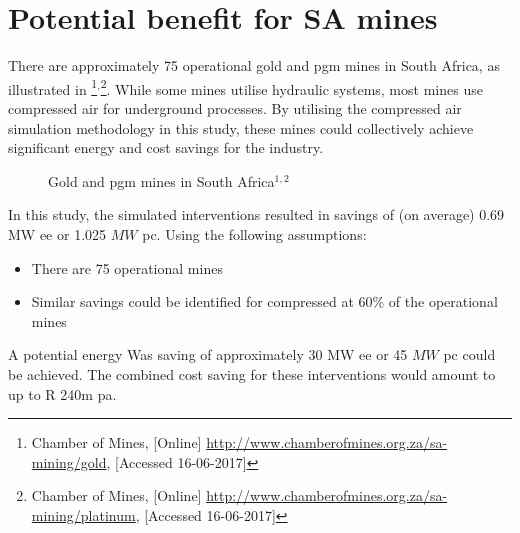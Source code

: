 \section{Potential benefit for SA mines}
There are approximately 75 operational gold and \gls{pgm} mines in South Africa, as illustrated in  \footnote{Chamber of Mines, [Online] \url{http://www.chamberofmines.org.za/sa-mining/gold}, [Accessed 16-06-2017]}$^,$\footnote{Chamber of Mines, [Online] \url{http://www.chamberofmines.org.za/sa-mining/platinum}, [Accessed 16-06-2017]}. While some mines utilise hydraulic systems, most mines use compressed air for underground processes. By utilising the compressed air simulation methodology in this study, these mines could collectively achieve significant energy and cost savings for the industry. 
\par 
	\begin{figure}[h!]
		\centering
		\caption[Gold and Platinum group metal mines in South Africa]{Gold and \gls{pgm} mines in South Africa$^{1,2}$}
		\label{fig: Mine map}
	\end{figure}
In this study, the simulated interventions resulted in savings of (on average) 0.69 MW \gls{ee} or 1.025 $ MW $ \gls{pc}. Using the following assumptions:
\begin{itemize}
	\item There are 75 operational mines
	\item Similar savings could be identified for compressed at 60\% of the operational mines
\end{itemize} 
A potential energy Was saving of approximately 30 MW \gls{ee} or 45 $ MW $ \gls{pc} could be achieved. The combined cost saving for these interventions would amount to up to R 240m \gls{pa}. 

